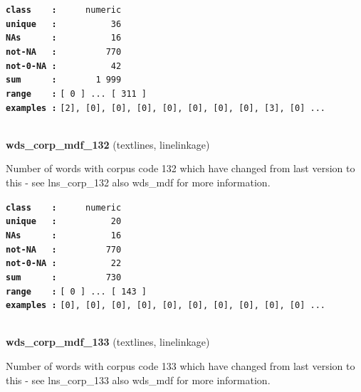 \documentclass[]{article}
\begin{document}
\textbf{\texttt{class\ \ \ \ :}} \texttt{~~~~~numeric}\\
\textbf{\texttt{unique\ \ \ :}} \texttt{~~~~~~~~~~36}\\
\textbf{\texttt{NAs\ \ \ \ \ \ :}} \texttt{~~~~~~~~~~16}\\
\textbf{\texttt{not-NA\ \ \ :}} \texttt{~~~~~~~~~770}\\
\textbf{\texttt{not-0-NA\ :}} \texttt{~~~~~~~~~~42}\\
\textbf{\texttt{sum\ \ \ \ \ \ :}} \texttt{~~~~~~~1~999}\\
\textbf{\texttt{range\ \ \ \ :}}
\texttt{{[}\ 0\ {]}\ ...\ {[}\ 311\ {]}}\\
\textbf{\texttt{examples\ :}}
\texttt{{[}2{]},\ {[}0{]},\ {[}0{]},\ {[}0{]},\ {[}0{]},\ {[}0{]},\ {[}0{]},\ {[}0{]},\ {[}3{]},\ {[}0{]}\ ...}\\

~

\textbf{wds\_corp\_mdf\_132} (textlines, linelinkage)

Number of words with corpus code 132 which have changed from last
version to this - see lns\_corp\_132 also wds\_mdf for more information.

\textbf{\texttt{class\ \ \ \ :}} \texttt{~~~~~numeric}\\
\textbf{\texttt{unique\ \ \ :}} \texttt{~~~~~~~~~~20}\\
\textbf{\texttt{NAs\ \ \ \ \ \ :}} \texttt{~~~~~~~~~~16}\\
\textbf{\texttt{not-NA\ \ \ :}} \texttt{~~~~~~~~~770}\\
\textbf{\texttt{not-0-NA\ :}} \texttt{~~~~~~~~~~22}\\
\textbf{\texttt{sum\ \ \ \ \ \ :}} \texttt{~~~~~~~~~730}\\
\textbf{\texttt{range\ \ \ \ :}}
\texttt{{[}\ 0\ {]}\ ...\ {[}\ 143\ {]}}\\
\textbf{\texttt{examples\ :}}
\texttt{{[}0{]},\ {[}0{]},\ {[}0{]},\ {[}0{]},\ {[}0{]},\ {[}0{]},\ {[}0{]},\ {[}0{]},\ {[}0{]},\ {[}0{]}\ ...}\\

~

\textbf{wds\_corp\_mdf\_133} (textlines, linelinkage)

Number of words with corpus code 133 which have changed from last
version to this - see lns\_corp\_133 also wds\_mdf for more information.
\end{document}
